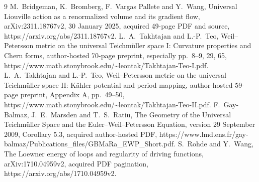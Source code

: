\documentclass[10pt]{article}
\begin{document}
9 M. Bridgeman, K. Bromberg, F. Vargas Pallete and Y. Wang, Universal Liouville action as a renormalized volume and its gradient flow, arXiv:2311.18767v2, 30 January 2025, acquired 49-page PDF and source, https://arxiv.org/abs/2311.18767v2. L. A. Takhtajan and L.-P. Teo, Weil–Petersson metric on the universal Teichmüller space I: Curvature properties and Chern forms, author-hosted 70-page preprint, especially pp. 8–9, 29, 65, https://www.math.stonybrook.edu/\textasciitilde{}leontak/Takhtajan-Teo-I.pdf. L. A. Takhtajan and L.-P. Teo, Weil–Petersson metric on the universal Teichmüller space II: Kähler potential and period mapping, author-hosted 59-page preprint, Appendix A, pp. 49–50, https://www.math.stonybrook.edu/\textasciitilde{}leontak/Takhtajan-Teo-II.pdf. F. Gay-Balmaz, J. E. Marsden and T. S. Ratiu, The Geometry of the Universal Teichmüller Space and the Euler–Weil–Petersson Equation, version 29 September 2009, Corollary 5.3, acquired author-hosted PDF, https://www.lmd.ens.fr/gay-balmaz/Publications\_files/GBMaRa\_EWP\_Short.pdf. S. Rohde and Y. Wang, The Loewner energy of loops and regularity of driving functions, arXiv:1710.04959v2, acquired PDF pagination, https://arxiv.org/abs/1710.04959v2.\par
\end{document}
